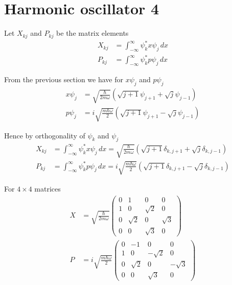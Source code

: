 


\section*{Harmonic oscillator 4}

Let $X_{kj}$ and $P_{kj}$ be the matrix elements
\begin{align*}
X_{kj}&=\int_{-\infty}^\infty \psi_k^*x\psi_j\,dx
\\[1ex]
P_{kj}&=\int_{-\infty}^\infty \psi_k^*p\psi_j\,dx
\end{align*}

From the previous section we have for $x\psi_j$ and $p\psi_j$
\begin{align*}
x\psi_j&=\sqrt{\frac{\hbar}{2m\omega}}\left(\sqrt{j+1}\psi_{j+1}+\sqrt j\psi_{j-1}\right)
\\[1ex]
p\psi_j&=i\sqrt{\frac{m\hbar\omega}{2}}\left(\sqrt{j+1}\psi_{j+1}-\sqrt j\psi_{j-1}\right)
\end{align*}

Hence by orthogonality of $\psi_k$ and $\psi_j$
\begin{align*}
X_{kj}&=\int_{-\infty}^\infty \psi_k^*x\psi_j\,dx
=\sqrt{\frac{\hbar}{2m\omega}}\left(\sqrt{j+1}\delta_{k,j+1}+\sqrt j\delta_{k,j-1}\right)
\\[1ex]
P_{kj}&=\int_{-\infty}^\infty \psi_k^*p\psi_j\,dx
=i\sqrt{\frac{m\hbar\omega}{2}}\left(\sqrt{j+1}\delta_{k,j+1}-\sqrt j\delta_{k,j-1}\right)
\end{align*}

For $4\times4$ matrices
\begin{align*}
X&=\sqrt{\frac{\hbar}{2m\omega}}
\begin{pmatrix}
0 & 1 & 0 & 0
\\
1 & 0 & \sqrt{2} & 0
\\
0 & \sqrt{2} & 0 & \sqrt{3}
\\
0 & 0 & \sqrt{3} & 0
\end{pmatrix}
\\[1ex]
P&=i\sqrt{\frac{m\hbar\omega}{2}}
\begin{pmatrix}
0 & -1 & 0 & 0
\\
1 & 0 & -\sqrt{2} & 0
\\
0 & \sqrt{2} & 0 & -\sqrt{3}
\\
0 & 0 & \sqrt{3} & 0
\end{pmatrix}
\end{align*}

